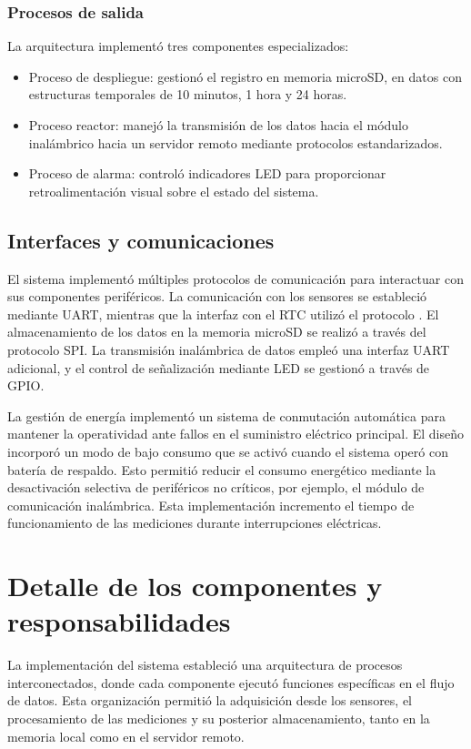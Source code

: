 \subsubsection{Procesos de salida}

La arquitectura implementó tres componentes especializados:
\begin{itemize}
	\item Proceso de despliegue: gestionó el registro en memoria microSD, en datos con estructuras temporales de 10 minutos, 1 hora y 24 horas.
	\item Proceso reactor: manejó la transmisión de los datos hacia el módulo inalámbrico hacia un servidor remoto mediante protocolos estandarizados.
	\item Proceso de alarma: controló indicadores LED para proporcionar retroalimentación visual sobre el estado del sistema.
\end{itemize}

\subsection{Interfaces y comunicaciones}

El sistema implementó múltiples protocolos de comunicación para interactuar con sus componentes periféricos. La comunicación con los sensores \MPF se estableció mediante UART, mientras que la interfaz con el RTC utilizó el protocolo \IIC. El almacenamiento de los datos en la memoria microSD se realizó a través del protocolo SPI. La transmisión inalámbrica de datos empleó una interfaz UART adicional, y el control de señalización mediante LED se gestionó a través de GPIO.

La gestión de energía implementó un sistema de conmutación automática para mantener la operatividad ante fallos en el suministro eléctrico principal. El diseño incorporó un modo de bajo consumo que se activó cuando el sistema operó con batería de respaldo. Esto permitió reducir el consumo energético mediante la desactivación selectiva de periféricos no críticos, por ejemplo, el módulo de comunicación inalámbrica. Esta implementación incremento el tiempo de funcionamiento de las mediciones durante interrupciones eléctricas.


\section{Detalle de los componentes y responsabilidades}

La implementación del sistema estableció una arquitectura de procesos interconectados, donde cada componente ejecutó funciones específicas en el flujo de datos. Esta organización permitió la adquisición desde los sensores, el procesamiento de las mediciones y su posterior almacenamiento, tanto en la memoria local como en el servidor remoto.

